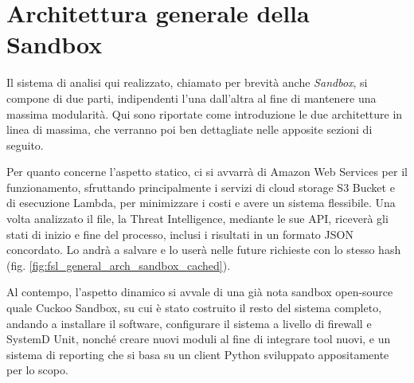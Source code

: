 \section{Architettura generale della Sandbox}

Il sistema di analisi qui realizzato, chiamato per brevità anche \emph{Sandbox},
si compone di due parti, indipendenti l'una dall'altra al fine di mantenere una massima modularità.
Qui sono riportate come introduzione le due architetture in linea di massima, che verranno poi ben dettagliate nelle apposite sezioni di seguito.

Per quanto concerne l'aspetto statico, ci si avvarrà di Amazon Web Services per il funzionamento,
sfruttando principalmente i servizi di cloud storage S3 Bucket e di esecuzione Lambda, per minimizzare i costi e avere un sistema flessibile.
Una volta analizzato il file, la Threat Intelligence, mediante le sue API, riceverà gli stati di inizio e fine del processo, inclusi i risultati in un formato JSON concordato. Lo andrà a salvare e lo userà nelle future richieste con lo stesso hash (fig. \ref{fig:fsl_general_arch_sandbox_cached}).

Al contempo, l'aspetto dinamico si avvale di una già nota sandbox open-source quale Cuckoo Sandbox,
su cui è stato costruito il resto del sistema completo,
andando a installare il software, configurare il sistema a livello di firewall e SystemD Unit,
nonché creare nuovi moduli al fine di integrare tool nuovi, e un sistema di reporting che si basa su un client Python sviluppato appositamente per lo scopo.

